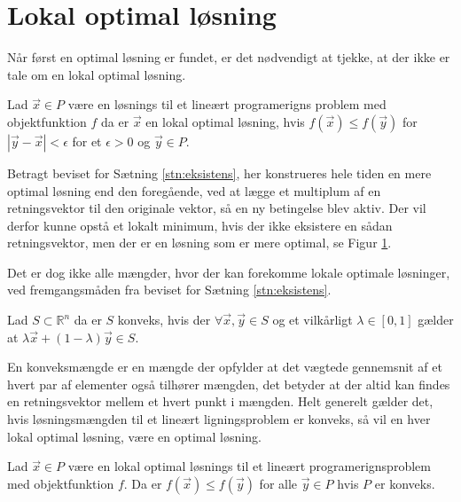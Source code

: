 \section{Lokal optimal løsning}
Når først en optimal løsning er fundet, er det nødvendigt at tjekke, at der ikke er tale om en lokal optimal løsning.
\begin{defn}
Lad $\vec{x} \in P$ være en løsnings til et lineært programerigns problem med objektfunktion $f$ da er $\vec{x}$ en lokal optimal løsning, hvis $f(\vec{x}) \leq f(\vec{y})$ for $|\vec{y}-\vec{x}|< \epsilon$ for et $\epsilon > 0$ og $\vec{y} \in P$.
\end{defn}
Betragt beviset for Sætning \ref{stn:eksistens}, her konstrueres hele tiden en mere optimal løsning end den foregående, ved at lægge et multiplum af en retningsvektor til den originale vektor, så en ny betingelse blev aktiv.
Der vil derfor kunne opstå et lokalt minimum, hvis der ikke eksistere en sådan retningsvektor, men der er en løsning som er mere optimal, se Figur \ref{fig:lokaltmin}.
\begin{figure}
\begin{center}
	
	\label{fig:lokaltmin}
\end{center}
\end{figure}
Det er dog ikke alle mængder, hvor der kan forekomme lokale optimale løsninger, ved fremgangsmåden fra beviset for Sætning \ref{stn:eksistens}.
\begin{defn} 
Lad $S \subset \mathds{R}^n$  da er $S$ konveks, hvis der $\forall \vec{x}, \vec{y} \in S$ og et vilkårligt $\lambda \in [0,1]$ gælder at $\lambda \vec{x} + (1-\lambda) \vec{y} \in S$.
\label{def:Konveks}
\end{defn}
En konveksmængde er en mængde der opfylder at det vægtede gennemsnit af et hvert par af elementer også tilhører mængden, det betyder at der altid kan findes en retningsvektor mellem et hvert punkt i mængden.
Helt generelt gælder det, hvis løsningsmængden til et lineært ligningsproblem er konveks, så vil en hver lokal optimal løsning, være en optimal løsning.
\begin{stn}
Lad $\vec{x} \in P$ være en lokal optimal løsnings til et lineært programerignsproblem  med objektfunktion $f$.
Da er  $f(\vec{x}) \leq f(\vec{y})$ for alle $\vec{y} \in P$ hvis $P$ er konveks.
\end{stn}
